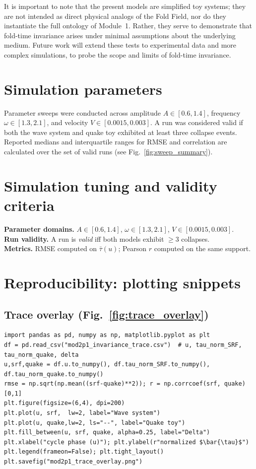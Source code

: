 \documentclass[12pt]{article}
\begin{document}
It is important to note that the present models are simplified toy systems;
they are not intended as direct physical analogs of the Fold Field, nor do they
instantiate the full ontology of Module~1. Rather, they serve to demonstrate
that fold-time invariance arises under minimal assumptions about the underlying
medium. Future work will extend these tests to experimental data and more complex
simulations, to probe the scope and limits of fold-time invariance.
\appendix
\section{Simulation parameters}
Parameter sweeps were conducted across amplitude $A \in [0.6, 1.4]$, frequency
$\omega \in [1.3, 2.1]$, and velocity $V \in [0.0015, 0.003]$. A run was considered
valid if both the wave system and quake toy exhibited at least three collapse
events. Reported medians and interquartile ranges for RMSE and correlation are
calculated over the set of valid runs (see Fig.~\ref{fig:sweep_summary}).
\section{Simulation tuning and validity criteria}
\noindent\textbf{Parameter domains.} $A\in[0.6,1.4]$, $\omega\in[1.3,2.1]$, $V\in[0.0015,0.003]$.\\
\noindent\textbf{Run validity.} A run is \emph{valid} iff both models exhibit $\geq 3$ collapses.\\
\noindent\textbf{Metrics.} RMSE computed on $\bar{\tau}(u)$; Pearson $r$ computed on the same support.

\section{Reproducibility: plotting snippets}

\subsection{Trace overlay (Fig.~\ref{fig:trace_overlay})}
\begin{lstlisting}
import pandas as pd, numpy as np, matplotlib.pyplot as plt
df = pd.read_csv("mod2p1_invariance_trace.csv")  # u, tau_norm_SRF, tau_norm_quake, delta
u,srf,quake = df.u.to_numpy(), df.tau_norm_SRF.to_numpy(), df.tau_norm_quake.to_numpy()
rmse = np.sqrt(np.mean((srf-quake)**2)); r = np.corrcoef(srf, quake)[0,1]
plt.figure(figsize=(6,4), dpi=200)
plt.plot(u, srf,  lw=2, label="Wave system")
plt.plot(u, quake,lw=2, ls="--", label="Quake toy")
plt.fill_between(u, srf, quake, alpha=0.25, label="Delta")
plt.xlabel("cycle phase (u)"); plt.ylabel(r"normalized $\bar{\tau}$")
plt.legend(frameon=False); plt.tight_layout()
plt.savefig("mod2p1_trace_overlay.png")
\end{lstlisting}
\end{document}
